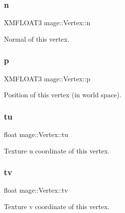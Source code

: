 \subsubsection{\texorpdfstring{n}{n}}
{\footnotesize\ttfamily X\+M\+F\+L\+O\+A\+T3 mage\+::\+Vertex\+::n}

Normal of this vertex. \hypertarget{structmage_1_1_vertex_a9d726a508934b3baccfb01ea912420e7}{}\label{structmage_1_1_vertex_a9d726a508934b3baccfb01ea912420e7} 
\subsubsection{\texorpdfstring{p}{p}}
{\footnotesize\ttfamily X\+M\+F\+L\+O\+A\+T3 mage\+::\+Vertex\+::p}

Position of this vertex (in world space). \hypertarget{structmage_1_1_vertex_a76d6a0ace40807f67c87e0dacd66da0d}{}\label{structmage_1_1_vertex_a76d6a0ace40807f67c87e0dacd66da0d} 
\subsubsection{\texorpdfstring{tu}{tu}}
{\footnotesize\ttfamily float mage\+::\+Vertex\+::tu}

Texture u coordinate of this vertex. \hypertarget{structmage_1_1_vertex_a08bf58ceae5197299c71204024b09ed2}{}\label{structmage_1_1_vertex_a08bf58ceae5197299c71204024b09ed2} 
\subsubsection{\texorpdfstring{tv}{tv}}
{\footnotesize\ttfamily float mage\+::\+Vertex\+::tv}

Texture v coordinate of this vertex. 
